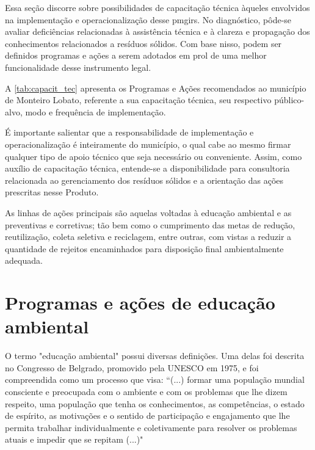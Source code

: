 Essa seção discorre sobre possibilidades de capacitação técnica àqueles envolvidos na implementação e operacionalização desse \gls{pmgirs}. No diagnóstico, pôde-se avaliar deficiências relacionadas à assistência técnica e à clareza e propagação dos conhecimentos relacionados a resíduos sólidos. Com base nisso, podem ser definidos programas e ações a serem adotados em prol de uma melhor funcionalidade desse instrumento legal.

A \autoref{tab:capacit_tec} apresenta os Programas e Ações recomendados ao município de Monteiro Lobato, referente a sua capacitação técnica, seu respectivo público-alvo, modo e frequência de implementação.

	
	
É importante salientar que a responsabilidade de implementação e operacionalização é inteiramente do município, o qual cabe ao mesmo firmar qualquer tipo de apoio técnico que seja necessário ou conveniente. Assim, como auxílio de capacitação técnica, entende-se a disponibilidade para consultoria relacionada ao gerenciamento dos resíduos sólidos e a orientação das ações prescritas nesse Produto.

As linhas de ações principais são aquelas voltadas à educação ambiental e as preventivas e corretivas; tão bem como o cumprimento das metas de redução, reutilização, coleta seletiva e reciclagem, entre outras, com vistas a reduzir a quantidade de rejeitos encaminhados para disposição final ambientalmente adequada.

\FloatBarrier
\newpage
\section{Programas e ações de educação ambiental}
\label{sec:educ_amb}

\label{sec:educ_amb}
O termo "educação ambiental" possui diversas definições. Uma delas foi descrita no Congresso de Belgrado, promovido pela UNESCO em 1975, e foi compreendida como um processo que visa: “(...) formar uma população mundial consciente e preocupada com o ambiente e com os problemas que lhe dizem respeito, uma população que tenha os conhecimentos, as competências, o estado de espírito, as motivações e o sentido de participação e engajamento que lhe permita trabalhar individualmente e coletivamente para resolver os problemas atuais e impedir que se repitam (...)" 

